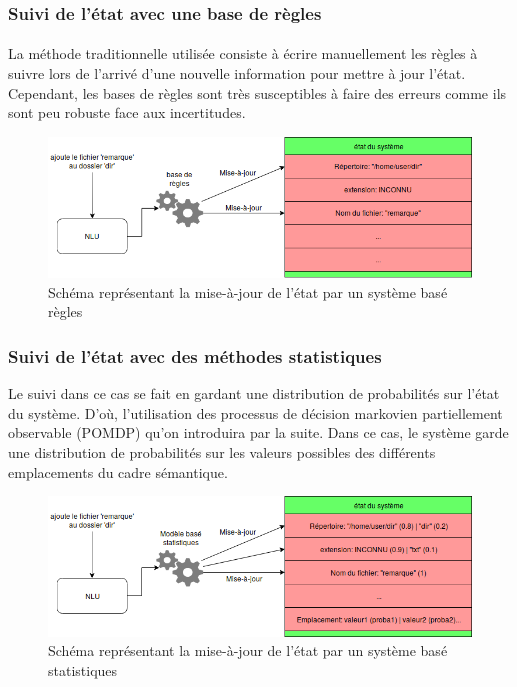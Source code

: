 \subsubsection{Suivi de l’état avec une base de règles}\label{suivi}
\paragraph{}
La méthode traditionnelle utilisée consiste à écrire manuellement les règles à suivre lors de l’arrivé d’une nouvelle information pour mettre à jour l’état\cite{Goddeau1996}. Cependant, les bases de règles sont très susceptibles à faire des erreurs\cite{Chen2017} comme ils sont peu robuste face aux incertitudes.


\begin{figure}[H]
	\centering
	\includegraphics[width=.7\linewidth]{images/DM/RuleBasedUpdate.png} 
	\caption{Schéma représentant la mise-à-jour de l'état par un système basé règles} 
\end{figure}

\subsubsection{Suivi de l’état avec des méthodes statistiques}
Le suivi dans ce cas se fait en gardant une distribution de probabilités sur l’état du système. D’où, l’utilisation des processus de décision markovien partiellement observable (POMDP)\cite{Young2010} qu’on introduira par la suite. Dans ce cas, le système garde une distribution de probabilités sur les valeurs possibles des différents emplacements du cadre sémantique.

\begin{figure}[H]
	\centering
	\includegraphics[width=.7\linewidth]{images/DM/StatBasedUpdate.png} 
	\caption{Schéma représentant la mise-à-jour de l'état par un système basé statistiques} 
\end{figure}

